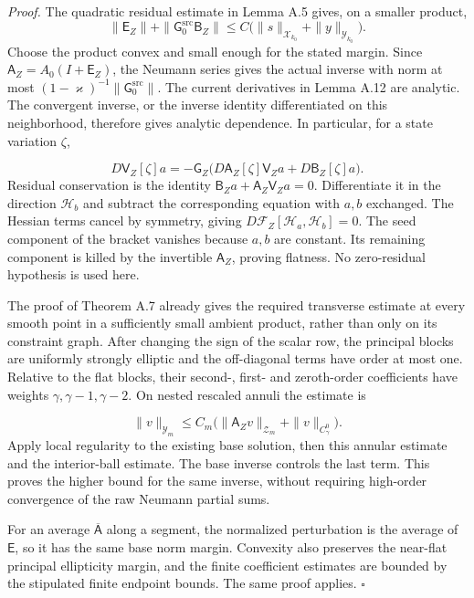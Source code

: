 \documentclass[
  english,
  11pt,
  reqno]{amsart}
\begin{document}
\emph{Proof.} The quadratic residual estimate in Lemma A.5 gives, on a
smaller product, \[
\|\mathsf E_Z\|
+\|\mathsf G_0^{\mathrm{src}}\mathsf B_Z\|
\le C\bigl(\|s\|_{\mathcal X_{k_0}}+\|y\|_{\mathcal Y_{k_0}}\bigr).
\] Choose the product convex and small enough for the stated margin.
Since \(\mathsf A_Z=A_0(I+\mathsf E_Z)\), the Neumann series gives the
actual inverse with norm at most
\((1-\varkappa)^{-1}\|\mathsf G_0^{\mathrm{src}}\|\). The current
derivatives in Lemma A.12 are analytic. The convergent inverse, or the
inverse identity differentiated on this neighborhood, therefore gives
analytic dependence. In particular, for a state variation \(\zeta\),

\label{eq:online-current-horizontal-differential} \[
D\mathsf V_Z[\zeta]a
=-\mathsf G_Z\bigl(D\mathsf A_Z[\zeta]\mathsf V_Za
                   +D\mathsf B_Z[\zeta]a\bigr).
\] Residual conservation is the identity
\(\mathsf B_Za+\mathsf A_Z\mathsf V_Za=0\). Differentiate it in the
direction \(\mathscr H_b\) and subtract the corresponding equation with
\(a,b\) exchanged. The Hessian terms cancel by symmetry, giving
\(D\mathcal F_Z[\mathscr H_a,\mathscr H_b]=0\). The seed component of
the bracket vanishes because \(a,b\) are constant. Its remaining
component is killed by the invertible \(\mathsf A_Z\), proving flatness.
No zero-residual hypothesis is used here.

The proof of Theorem A.7 already gives the required transverse estimate
at every smooth point in a sufficiently small ambient product, rather
than only on its constraint graph. After changing the sign of the scalar
row, the principal blocks are uniformly strongly elliptic and the
off-diagonal terms have order at most one. Relative to the flat blocks,
their second-, first- and zeroth-order coefficients have weights
\(\gamma,\gamma-1,\gamma-2\). On nested rescaled annuli the estimate is

\label{eq:online-current-higher-transverse-estimate} \[
\|v\|_{\mathcal Y_m}
\le C_m\bigl(\|\mathsf A_Zv\|_{\mathcal Z_m}
                  +\|v\|_{C^0_\gamma}\bigr).
\] Apply local regularity to the existing base solution, then this
annular estimate and the interior-ball estimate. The base inverse
controls the last term. This proves the higher bound for the same
inverse, without requiring high-order convergence of the raw Neumann
partial sums.

For an average \(\overline{\mathsf A}\) along a segment, the normalized
perturbation is the average of \(\mathsf E\), so it has the same base
norm margin. Convexity also preserves the near-flat principal
ellipticity margin, and the finite coefficient estimates are bounded by
the stipulated finite endpoint bounds. The same proof applies.
\hfill\(\square\)
\end{document}
